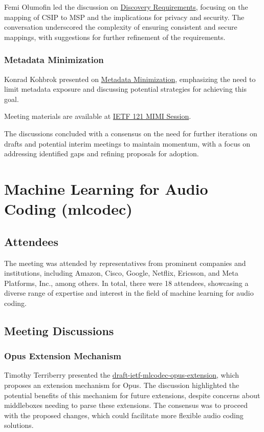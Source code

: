 \documentclass{article}
\begin{document}
Femi Olumofin led the discussion on \href{https://www.ietf.org/archive/id/draft-interop-mimi-discovery-requirements-01.html}{Discovery Requirements}, focusing on the mapping of CSIP to MSP and the implications for privacy and security. The conversation underscored the complexity of ensuring consistent and secure mappings, with suggestions for further refinement of the requirements.

\subsubsection{Metadata Minimization}

Konrad Kohbrok presented on \href{https://datatracker.ietf.org/doc/draft-kohbrok-mimi-metadata-minimalization/}{Metadata Minimization}, emphasizing the need to limit metadata exposure and discussing potential strategies for achieving this goal.

Meeting materials are available at \href{https://datatracker.ietf.org/meeting/121/session/mimi}{IETF 121 MIMI Session}.

The discussions concluded with a consensus on the need for further iterations on drafts and potential interim meetings to maintain momentum, with a focus on addressing identified gaps and refining proposals for adoption.



\newpage

\section{Machine Learning for Audio Coding (mlcodec)}

\subsection{Attendees}
The meeting was attended by representatives from prominent companies and institutions, including Amazon, Cisco, Google, Netflix, Ericsson, and Meta Platforms, Inc., among others. In total, there were 18 attendees, showcasing a diverse range of expertise and interest in the field of machine learning for audio coding.

\subsection{Meeting Discussions}

\subsubsection{Opus Extension Mechanism}
Timothy Terriberry presented the \href{https://datatracker.ietf.org/doc/html/draft-ietf-mlcodec-opus-extension}{draft-ietf-mlcodec-opus-extension}, which proposes an extension mechanism for Opus. The discussion highlighted the potential benefits of this mechanism for future extensions, despite concerns about middleboxes needing to parse these extensions. The consensus was to proceed with the proposed changes, which could facilitate more flexible audio coding solutions.
\end{document}
